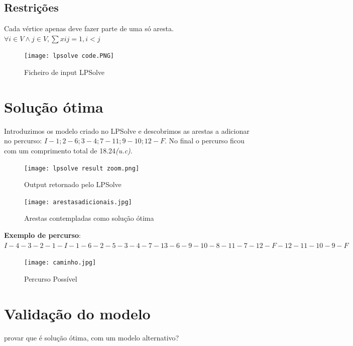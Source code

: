 \documentclass[runningheads]{llncs}
\begin{document}
    \newpage
    \subsection{Restrições}
    Cada vértice apenas deve fazer parte de uma só aresta.
    \newline $\forall i \in V \wedge  j \in V,  \sum xij = 1, i < j$

    \begin{figure}[ht]
        \centering
        \texttt{[image: lpsolve code.PNG]}
        \caption{Ficheiro de input LPSolve}
        \label{fig:data4}
    \end{figure}

    \newpage

    \section{Solução ótima}
    Introduzimos os modelo criado no LPSolve e descobrimos as arestas a adicionar no
    percurso: $I-1; 2-6; 3-4; 7-11; 9-10; 12-F$. No final o percurso ficou com um comprimento total de 18.24\textit{(u.c)}.

    \begin{figure}[ht]
        \centering
        \texttt{[image: lpsolve result zoom.png]}
        \caption{Output retornado pelo LPSolve}
        \label{fig:data5}
    \end{figure}

    \begin{figure}[ht]
        \centering
        \texttt{[image: arestasadicionais.jpg]}
        \caption{Arestas contempladas como solução ótima}
        \label{fig:data6}
    \end{figure}

    \newpage


    \clearpage

    \textbf{Exemplo de percurso}:
    \newline $I-4-3-2-1-I-1-6-2-5-3-4-7-13-6-9-10-8-11-7-12-F-12-11-10-9-F$

    \begin{figure}[h]
        \centering
        \texttt{[image: caminho.jpg]}
        \caption{Percurso Possível}
        \label{fig:data7}
    \end{figure}

    \section{Validação do modelo}

    provar que é solução ótima, com um modelo alternativo?
\end{document}
